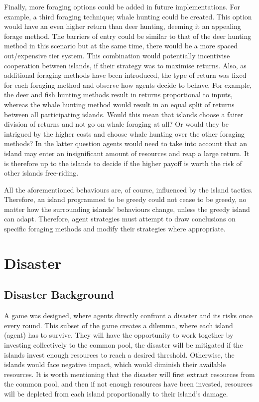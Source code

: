 Finally, more foraging options could be added in future implementations. For example, a third foraging technique; whale hunting could be created. This option would have an even higher return than deer hunting, deeming it an appealing forage method. The barriers of entry could be similar to that of the deer hunting method in this scenario but at the same time, there would be a more spaced out/expensive tier system. This combination would potentially incentivise cooperation between islands, if their strategy was to maximise returns. Also, as additional foraging methods have been introduced, the type of return was fixed for each foraging method and observe how agents decide to behave. For example, the deer and fish hunting methods result in returns proportional to inputs, whereas the whale hunting method would result in an equal split of returns between all participating islands. Would this mean that islands choose a fairer division of returns and not go on whale foraging at all? Or would they be intrigued by the higher costs and choose whale hunting over the other foraging methods? In the latter question agents would need to take into account that an island may enter an insignificant amount of resources and reap a large return. It is therefore up to the islands to decide if the higher payoff is worth the risk of other islands free-riding.

All the aforementioned behaviours are, of course, influenced by the island tactics. Therefore, an island programmed to be greedy could not cease to be greedy, no matter how the surrounding islands’ behaviours change, unless the greedy island can adapt. Therefore, agent strategies must attempt to draw conclusions on specific foraging methods and modify their strategies where appropriate.

\newpage
\section{Disaster}
\subsection{Disaster Background}

A game was designed, where agents directly confront a disaster and its risks once every round. This subset of the game creates a dilemma, where each island (agent) has to survive. They will have the opportunity to work together by investing collectively to the common pool, the disaster will be mitigated if the islands invest enough resources to reach a desired threshold. Otherwise, the islands would face negative impact, which would diminish their available resources. It is worth mentioning that the disaster will first extract resources from the common pool, and then if not enough resources have been invested, resources will be depleted from each island proportionally to their island’s damage.

